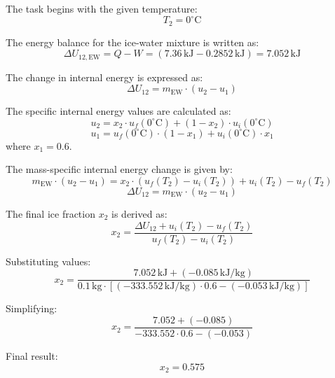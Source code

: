 The task begins with the given temperature:  
\[
T_2 = 0^\circ \text{C}
\]

The energy balance for the ice-water mixture is written as:  
\[
\Delta U_{12,\text{EW}} = Q - W = (7.36 \, \text{kJ} - 0.2852 \, \text{kJ}) = 7.052 \, \text{kJ}
\]

The change in internal energy is expressed as:  
\[
\Delta U_{12} = m_{\text{EW}} \cdot (u_2 - u_1)
\]

The specific internal energy values are calculated as:  
\[
u_2 = x_2 \cdot u_f(0^\circ \text{C}) + (1 - x_2) \cdot u_i(0^\circ \text{C})
\]  
\[
u_1 = u_f(0^\circ \text{C}) \cdot (1 - x_1) + u_i(0^\circ \text{C}) \cdot x_1
\]  
where \( x_1 = 0.6 \).

The mass-specific internal energy change is given by:  
\[
m_{\text{EW}} \cdot (u_2 - u_1) = x_2 \cdot (u_f(T_2) - u_i(T_2)) + u_i(T_2) - u_f(T_2)
\]  
\[
\Delta U_{12} = m_{\text{EW}} \cdot (u_2 - u_1)
\]

The final ice fraction \( x_2 \) is derived as:  
\[
x_2 = \frac{\Delta U_{12} + u_i(T_2) - u_f(T_2)}{u_f(T_2) - u_i(T_2)}
\]

Substituting values:  
\[
x_2 = \frac{7.052 \, \text{kJ} + (-0.085 \, \text{kJ/kg})}{0.1 \, \text{kg} \cdot \left[ (-333.552 \, \text{kJ/kg}) \cdot 0.6 - (-0.053 \, \text{kJ/kg}) \right]}
\]

Simplifying:  
\[
x_2 = \frac{7.052 + (-0.085)}{-333.552 \cdot 0.6 - (-0.053)}
\]

Final result:  
\[
x_2 = 0.575
\]